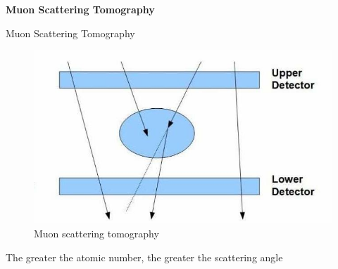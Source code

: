 \documentclass[14pt, aspectratio=169]{beamer}
\begin{document}
\begin{frame}{}
    \large \textbf{Muon Scattering Tomography}
\end{frame}
\begin{frame}{Muon Scattering Tomography}
    \centering
     {
        \begin{figure}
            \centering
            \includegraphics[scale = 0.4]{images/mst principle.jpg}
            \caption{Muon scattering tomography \cite{international2022iaea}}
        \end{figure}
        
    }
     {
        \large The greater the atomic number, the greater the scattering angle
    }
\end{frame}
\end{document}
